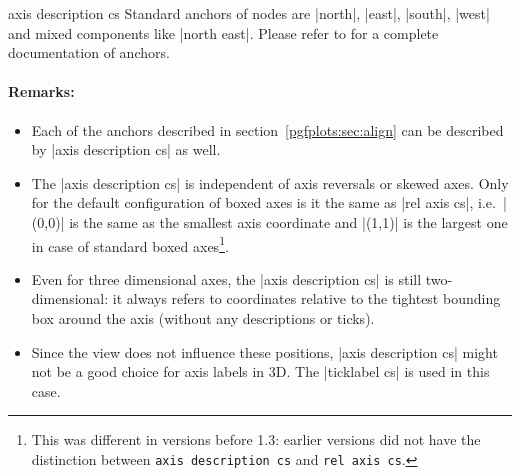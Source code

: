 \begin{coordinatesystem}{axis description cs}
	Standard anchors of nodes are |north|, |east|, |south|, |west| and mixed components like |north east|.
	Please refer to \cite{tikz} for a complete documentation of anchors.

\paragraph{Remarks:} 
\begin{itemize}
	\item Each of the anchors described in section~\ref{pgfplots:sec:align} can be described by |axis description cs| as well.
	\item The |axis description cs| is independent of axis reversals or skewed axes.
	Only for the default configuration of boxed axes is it the same as |rel axis cs|, i.e.\ |(0,0)| is the same as the smallest axis coordinate and |(1,1)| is the largest one in case of standard boxed axes\footnote{This was different in versions before 1.3: earlier versions did not have the distinction between \texttt{axis description cs} and \texttt{rel axis cs}.}.

	\item Even for three dimensional axes, the |axis description cs| is still two-dimensional: it always refers to coordinates relative to the tightest bounding box around the axis (without any descriptions or ticks).
\begin{codeexample}[width=4cm]
\end{codeexample}
	
	\item Since the view does not influence these positions, |axis description cs| might not be a good choice for axis labels in 3D. The |ticklabel cs| is used in this case.
\end{itemize}
\end{coordinatesystem}

